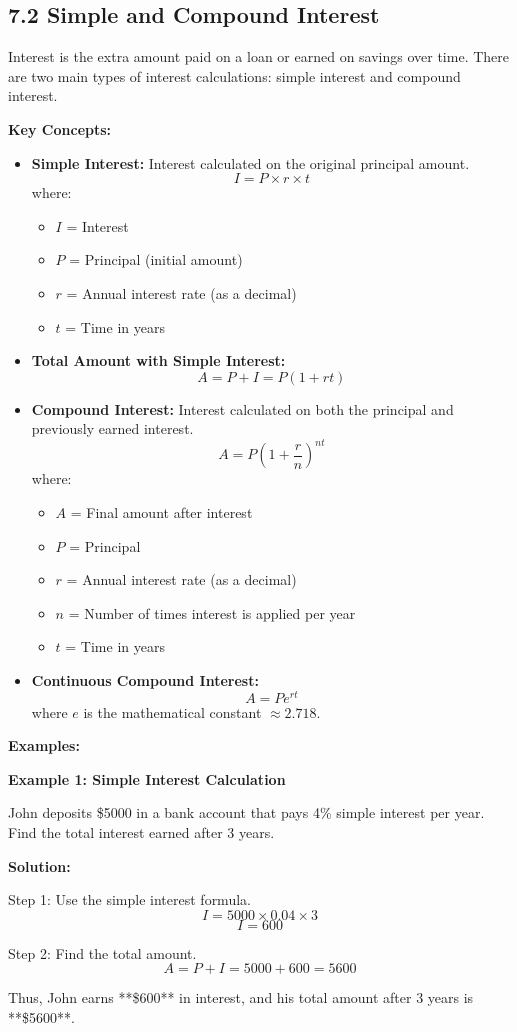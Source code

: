
\subsection*{7.2 Simple and Compound Interest}

Interest is the extra amount paid on a loan or earned on savings over time. There are two main types of interest calculations: simple interest and compound interest.

\textbf{Key Concepts:}
\begin{itemize}
	\item \textbf{Simple Interest:} Interest calculated on the original principal amount.
	\[
	I = P \times r \times t
	\]
	where:
	\begin{itemize}
		\item $I$ = Interest
		\item $P$ = Principal (initial amount)
		\item $r$ = Annual interest rate (as a decimal)
		\item $t$ = Time in years
	\end{itemize}
	
	\item \textbf{Total Amount with Simple Interest:}
	\[
	A = P + I = P(1 + rt)
	\]
	
	\item \textbf{Compound Interest:} Interest calculated on both the principal and previously earned interest.
	\[
	A = P \left(1 + \frac{r}{n} \right)^{nt}
	\]
	where:
	\begin{itemize}
		\item $A$ = Final amount after interest
		\item $P$ = Principal
		\item $r$ = Annual interest rate (as a decimal)
		\item $n$ = Number of times interest is applied per year
		\item $t$ = Time in years
	\end{itemize}
	
	\item \textbf{Continuous Compound Interest:}
	\[
	A = P e^{rt}
	\]
	where $e$ is the mathematical constant $\approx 2.718$.
\end{itemize}

\textbf{Examples:}

\begin{flushleft}
	\textbf{Example 1: Simple Interest Calculation}
	
	John deposits \$5000 in a bank account that pays 4\% simple interest per year. Find the total interest earned after 3 years.
	
	\textbf{Solution:}
	
	Step 1: Use the simple interest formula.
	\[
	I = 5000 \times 0.04 \times 3
	\]
	\[
	I = 600
	\]
	
	Step 2: Find the total amount.
	\[
	A = P + I = 5000 + 600 = 5600
	\]
	
	Thus, John earns **\$600** in interest, and his total amount after 3 years is **\$5600**.
\end{flushleft}

